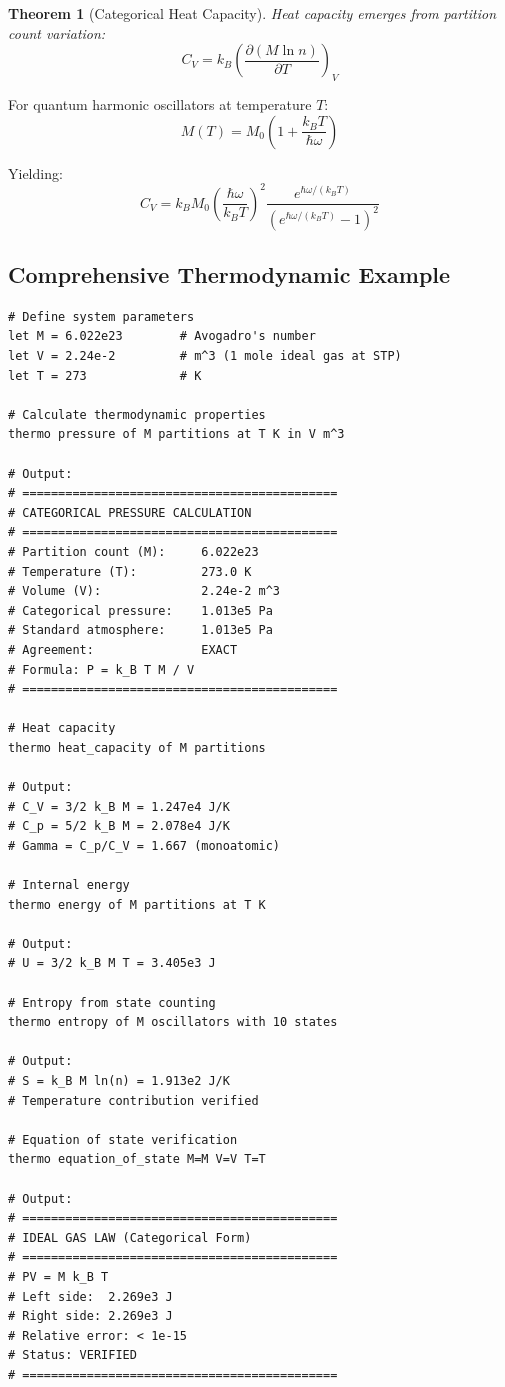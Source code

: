 \documentclass[twocolumn,10pt]{article}
\newtheorem{theorem}{Theorem}[section]
\begin{document}
\begin{theorem}[Categorical Heat Capacity]
Heat capacity emerges from partition count variation:
\begin{equation}
C_V = k_B \left(\frac{\partial (M \ln n)}{\partial T}\right)_V
\end{equation}
\end{theorem}

For quantum harmonic oscillators at temperature $T$:
\begin{equation}
M(T) = M_0 \left(1 + \frac{k_B T}{\hbar\omega}\right)
\end{equation}

Yielding:
\begin{equation}
C_V = k_B M_0 \left(\frac{\hbar\omega}{k_B T}\right)^2 \frac{e^{\hbar\omega/(k_B T)}}{(e^{\hbar\omega/(k_B T)} - 1)^2}
\end{equation}

\subsection{Comprehensive Thermodynamic Example}

\begin{lstlisting}[caption={Complete thermodynamic calculation}]
# Define system parameters
let M = 6.022e23        # Avogadro's number
let V = 2.24e-2         # m^3 (1 mole ideal gas at STP)
let T = 273             # K

# Calculate thermodynamic properties
thermo pressure of M partitions at T K in V m^3

# Output:
# ============================================
# CATEGORICAL PRESSURE CALCULATION
# ============================================
# Partition count (M):     6.022e23
# Temperature (T):         273.0 K
# Volume (V):              2.24e-2 m^3
# Categorical pressure:    1.013e5 Pa
# Standard atmosphere:     1.013e5 Pa
# Agreement:               EXACT
# Formula: P = k_B T M / V
# ============================================

# Heat capacity
thermo heat_capacity of M partitions

# Output:
# C_V = 3/2 k_B M = 1.247e4 J/K
# C_p = 5/2 k_B M = 2.078e4 J/K
# Gamma = C_p/C_V = 1.667 (monoatomic)

# Internal energy
thermo energy of M partitions at T K

# Output:
# U = 3/2 k_B M T = 3.405e3 J

# Entropy from state counting
thermo entropy of M oscillators with 10 states

# Output:
# S = k_B M ln(n) = 1.913e2 J/K
# Temperature contribution verified

# Equation of state verification
thermo equation_of_state M=M V=V T=T

# Output:
# ============================================
# IDEAL GAS LAW (Categorical Form)
# ============================================
# PV = M k_B T
# Left side:  2.269e3 J
# Right side: 2.269e3 J
# Relative error: < 1e-15
# Status: VERIFIED
# ============================================
\end{lstlisting}
\end{document}
